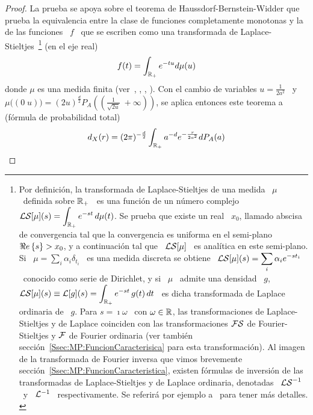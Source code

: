\begin{proof}
  La prueba se  apoya sobre el teorema de  Haussdorf-Bernstein-Widder que prueba
  la equivalencia  entre la clase de  funciones completamente monotonas  y la de
  las   funciones  \  $f$   \  que   se  escriben   como  una   transformada  de
  Laplace-Stieltjes~\footnote{Por     definici\'on,    la     transformada    de
    Laplace-Stieltjes de una medida \ $\mu$  \ definida sobre $\mathbb{R}_+$ \ es una
    funci\'on   de  un   n\'umero  complejo   \  $\displaystyle   \mathcal{LS}[\mu](s)  =
    \int_{\mathbb{R}_+} e^{-s t}  \, d\mu(t)$. Se prueba que existe  un real \ $x_0$,
    llamado abscisa  de convergencia tal que  la convergencia es  uniforma en el
    semi-plano \ $\Re e \left\{ s \right\}  > x_0$, y a continuaci\'on  tal que \ $\displaystyle
    \mathcal{LS}[\mu]$ \  es anal\'itica en este  semi-plano.  Si \  $\displaystyle \mu =
    \sum_i  \alpha_i  \delta_{t_i}$  \  es  una medida  discreta  se  obtiene  \
    $\displaystyle  \mathcal{LS}[\mu](s) = \sum_i  \alpha_i e^{-s  t_i}$ \  conocido como
    serie de Dirichlet, y si \ $\mu$ \ admite una densidad \ $g$, $\displaystyle
    \mathcal{LS}[\mu](s) \equiv  \mathcal{L}[g](s) = \int_{\mathbb{R}_+} e^{-s  t} \, g(t) \,  dt$ \ es
    dicha transformada de Laplace ordinaria de  \ $g$.  Para $s = \imath \omega$
    \ con  $\omega \in  \mathbb{R}$, las transformaciones  de Laplace-Stieltjes  y de
    Laplace coinciden con las transformaciones $\mathcal{FS}$ de Fourier-Stieltjes y $\mathcal{F}$
    de           Fourier            ordinaria           (ver           tambi\'en
    secci\'on~\ref{Ssec:MP:FuncionCaracterisica} para esta transformaci\'on). Al
    imagen  de   la  transformada  de  Fourier  inversa   que  vimos  brevemente
    secci\'on~\ref{Ssec:MP:FuncionCaracteristica},    existen    f\'ormulas   de
    inversi\'on  de   las  transformadas  de  Laplace-Stieltjes   y  de  Laplace
    ordinaria, denotadas  \ $\mathcal{LS}^{-1}$  \ y \  $\mathcal{L}^{-1}$ \  respectivamente.  Se
    referir\'a     por    ejemplo     a~\cite{Wid46}     para    tener     m\'as
    detalles. \label{Foot:MP:LaplaceStieltjes}} (en el eje real)
  \[
  f(t) = \int_{\mathbb{R}_+} e^{-t u} d\mu(u)
  \]
  donde  $\mu$  es  una  medida finita  (ver~\cite[Teo.~3]{Sch38},  \cite{Ber29,
    Hau21:I, Hau21:II,  Wid31}, \cite[\S~12]{Wid46}, \cite[\S~XIII.4]{Fel71}).
  Con el  cambio de variables  $u = \frac{1}{2  a^2}$ \ y  \ $\mu\big( (0  \; u)
  \big) =  (2 u)^{\frac{d}{2}} P_A\left( \left( \frac{1}{\sqrt{2  u}} \; +\infty
    \right) \right)$, se aplica entonces este teorema a (f\'ormula de probabilidad
  total)
  \[
  d_X(r)  =  (2 \pi)^{-\frac{d}{2}} \int_{\mathbb{R}_+} a^{-d} e^{-\frac{r}{2 a^2}} dP_A(a) 
  \]


\end{proof}
